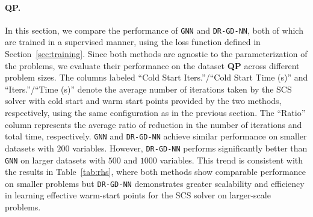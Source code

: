 \documentclass[10pt]{article} %
\begin{document}
\paragraph{QP.}
In this section, we compare the performance of \texttt{GNN} and \texttt{DR-GD-NN}, both of which are trained in a supervised manner, using the loss function defined in Section~\ref{sec:training}.
Since both methods are agnostic to the parameterization of the problems, we evaluate their performance on the dataset \textbf{QP} across different problem sizes.
The columns labeled \enquote{Cold Start Iters.}/\enquote{Cold Start Time (s)} and \enquote{Iters.}/\enquote{Time (s)} denote the average number of iterations taken by the SCS solver with cold start and warm start points provided by the two methods, respectively, using the same configuration as in the previous section. 
The \enquote{Ratio} column represents the average ratio of reduction in the number of iterations and total time, respectively.
\texttt{GNN} and \texttt{DR-GD-NN} achieve similar performance on smaller datasets with $200$ variables. 
However, \texttt{DR-GD-NN} performs significantly better than \texttt{GNN} on larger datasets with $500$ and $1000$ variables. 
This trend is consistent with the results in Table~\ref{tab:rhs}, where both methods show comparable performance on smaller problems but \texttt{DR-GD-NN} demonstrates greater scalability and efficiency in learning effective warm-start points for the SCS solver on larger-scale problems.
\end{document}
